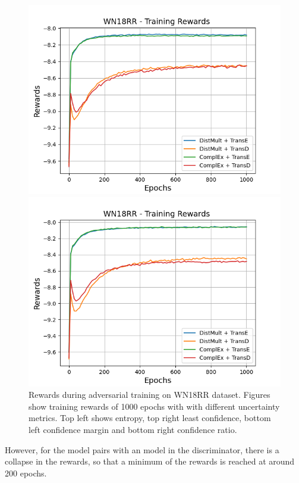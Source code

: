 \begin{figure}
\begin{minipage}{.5\textwidth}
      \centering
      \includegraphics[width=0.9\linewidth]{figures/results/gan_train/not_pretrained/uncertainty/max_distribution/confidence_margin/wn18rr/uncertainty_wn18rr_rew.png}
    \end{minipage}%
    \begin{minipage}{.5\textwidth}
      \centering
      \includegraphics[width=0.9\linewidth]{figures/results/gan_train/not_pretrained/uncertainty/max_distribution/confidence_ratio/wn18rr/uncertainty_wn18rr_rew.png}
    \end{minipage}%
    \caption{Rewards during adversarial training on \textsc{WN18RR} dataset. 
    Figures show training rewards of 1000 epochs with \ussoftmax with different uncertainty metrics.
    Top left shows entropy, top right least confidence, 
    bottom left confidence margin and bottom right confidence ratio.}
    \label{fig:advtrain_metrics_wn18rr_rew}
\end{figure}
However, for the model pairs with an \transd model in the discriminator, there is a collapse in the rewards, so that a minimum of the rewards is reached at around 200 epochs.

